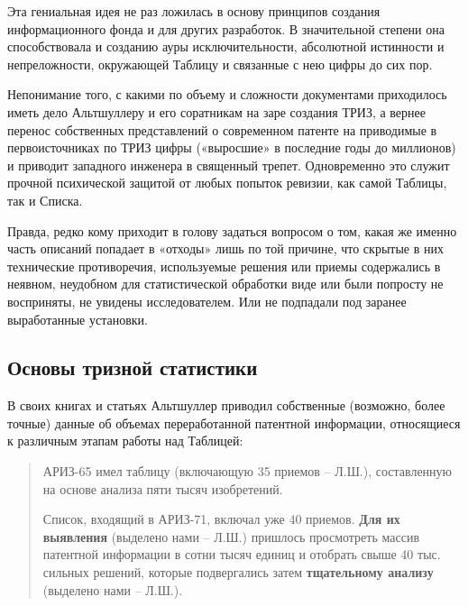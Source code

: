 \documentclass[11pt,a4paper]{article}
\begin{document}
Эта гениальная идея не раз ложилась в основу принципов создания
информационного фонда и для других разработок. В значительной степени она
способствовала и созданию ауры исключительности, абсолютной истинности и
непреложности, окружающей Таблицу и связанные с нею цифры до сих пор.

Непонимание того, с какими по объему и сложности документами приходилось иметь
дело Альтшуллеру и его соратникам на заре создания ТРИЗ, а вернее перенос
собственных представлений о современном патенте на приводимые в
первоисточниках по ТРИЗ цифры («выросшие» в последние годы до миллионов) и
приводит западного инженера в священный трепет. Одновременно это служит
прочной психической защитой от любых попыток ревизии, как самой Таблицы, так и
Списка.

Правда, редко кому приходит в голову задаться вопросом о том, какая же именно
часть описаний попадает в «отходы» лишь по той причине, что скрытые в них
технические противоречия, используемые решения или приемы содержались в
неявном, неудобном для статистической обработки виде или были попросту не
восприняты, не увидены исследователем. Или не подпадали под заранее
выработанные установки.

\subsection*{Основы тризной статистики}

В своих книгах и статьях Альтшуллер приводил собственные (возможно, более
точные) данные об объемах переработанной патентной информации, относящиеся к
различным этапам работы над Таблицей:
\begin{quote}
  АРИЗ-65 имел таблицу (включающую 35 приемов -- Л.Ш.), составленную на основе
  анализа пяти тысяч изобретений.  \cite[стр. 139]{Altshuller1973}

  Список, входящий в АРИЗ-71, включал уже 40 приемов. \textbf{Для их
    выявления} (выделено нами -- Л.Ш.) пришлось просмотреть массив патентной
  информации в сотни тысяч единиц и отобрать свыше 40 тыс. сильных решений,
  которые подвергались затем \textbf{тщательному анализу} (выделено нами --
  Л.Ш.).  \cite[стр. 83]{Altshuller1979}
\end{quote}
\end{document}
